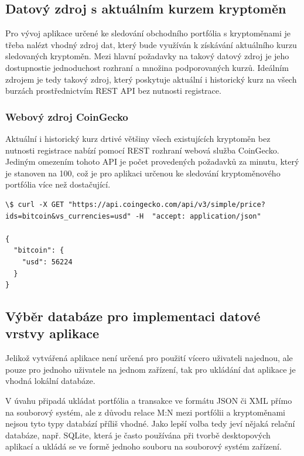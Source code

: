 \documentclass[12pt, a4paper]{article}
\begin{document}
    \subsection{Datový zdroj s aktuálním kurzem kryptoměn}

    Pro vývoj aplikace určené ke sledování obchodního portfólia s kryptoměnami je třeba nalézt vhodný zdroj dat, který bude využíván k získávání aktuálního kurzu sledovaných kryptoměn. Mezi hlavní požadavky na takový datový zdroj je jeho dostupnostie jednoduchost rozhraní a množina podporovaných kurzů. Ideálním zdrojem je tedy takový zdroj, který poskytuje aktuální i historický kurz na všech burzách prostřednictvím REST API bez nutnosti registrace.

    \subsubsection{Webový zdroj CoinGecko}
    Aktuální i historický kurz drtivé většiny všech existujících kryptoměn bez nutnosti registrace nabízí pomocí REST rozhraní webová služba CoinGecko\cite{coingecko2021}. Jediným omezením tohoto API je počet provedených požadavků za minutu, který je stanoven na 100, což je pro aplikaci určenou ke sledování kryptoměnového portfólia více než dostačující.

    \begin{lstlisting}
\$ curl -X GET "https://api.coingecko.com/api/v3/simple/price?ids=bitcoin&vs_currencies=usd" -H  "accept: application/json"

{
  "bitcoin": {
    "usd": 56224
  }
}
    \end{lstlisting}

    \subsection{Výběr databáze pro implementaci datové vrstvy aplikace}

    Jelikož vytvářená aplikace není určená pro použití vícero uživateli najednou, ale pouze pro jednoho uživatele na jednom zařízení, tak pro ukládání dat aplikace je vhodná lokální databáze.

    V úvahu připadá ukládat portfólia a transakce ve formátu JSON či XML přímo na souborový systém, ale z důvodu relace M:N mezi portfólii a kryptoměnami nejsou tyto typy databází příliš vhodné. Jako lepší volba tedy jeví nějaká relační databáze, např. SQLite, která je často používána při tvorbě desktopových aplikací a ukládá se ve formě jednoho souboru na souborový systém zařízení.
\end{document}
